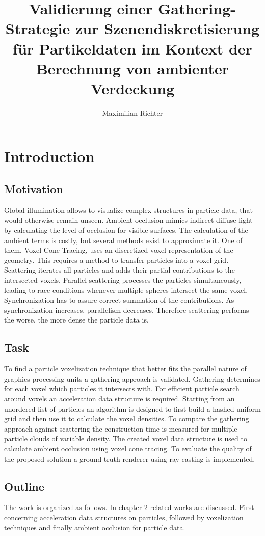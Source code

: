 \documentclass[hyperref,german,diplominf]{cgvpub}
\author{Maximilian Richter}
\title{Validierung einer Gathering-Strategie zur Szenendiskretisierung f\"ur Partikeldaten im Kontext der Berechnung von ambienter Verdeckung}
\begin{document}
\chapter{Introduction}

\section{Motivation}
Global illumination allows to visualize complex structures in particle data, that would otherwise remain unseen. Ambient occlusion mimics indirect diffuse light by calculating the level of occlusion for visible surfaces. The calculation of the ambient terms is costly, but several methods exist to approximate it. One of them, Voxel Cone Tracing, uses an discretized voxel representation of the geometry. This requires a method to transfer particles into a voxel grid. Scattering iterates all particles and adds their partial contributions to the intersected voxels. Parallel scattering processes the particles simultaneously, leading to race conditions whenever multiple spheres intersect the same voxel. Synchronization has to assure correct summation of the contributions. As synchronization increases, parallelism decreases. Therefore scattering performs the worse, the more dense the particle data is.

\section{Task}
To find a particle voxelization technique that better fits the parallel nature of graphics processing units a gathering approach is validated. Gathering determines for each voxel which particles it intersects with. For efficient particle search around voxels an acceleration data structure is required. Starting from an unordered list of particles an algorithm is designed to first build a hashed uniform grid and then use it to calculate the voxel densities. To compare the gathering approach against scattering the construction time is measured for multiple particle clouds of variable density. The created voxel data structure is used to calculate ambient occlusion using voxel cone tracing. To evaluate the quality of the proposed solution a ground truth renderer using ray-casting is implemented.

\section{Outline}

The work is organized as follows. In chapter 2 related works are discussed. First concerning acceleration data structures on particles, followed by voxelization techniques and finally ambient occlusion for particle data.
\end{document}
